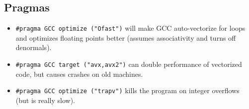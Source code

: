 \subsection{Pragmas}
\begin{itemize}
	\item \lstinline{#pragma GCC optimize ("Ofast")} will make GCC auto-vectorize for loops and optimizes floating points better (assumes associativity and turns off denormals).
	\item \lstinline{#pragma GCC target ("avx,avx2")} can double performance of vectorized code, but causes crashes on old machines.
	\item \lstinline{#pragma GCC optimize ("trapv")} kills the program on integer overflows (but is really slow).
\end{itemize}
